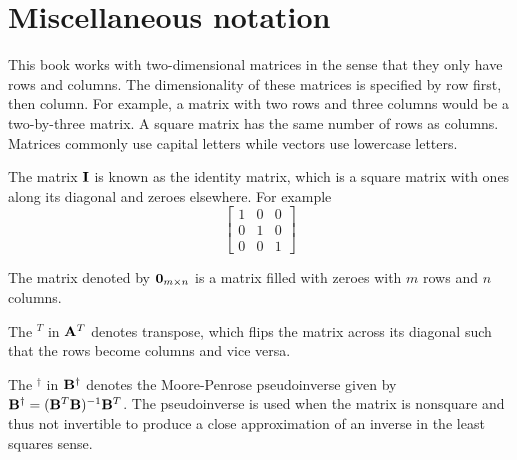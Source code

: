 \section{Miscellaneous notation}

This book works with two-dimensional matrices in the sense that they only have
rows and columns. The dimensionality of these matrices is specified by row
first, then column. For example, a matrix with two rows and three columns would
be a two-by-three matrix. A square matrix has the same number of rows as
columns. Matrices commonly use capital letters while vectors use lowercase
letters.

The matrix $\mathbf{I}$ is known as the identity matrix, which is a square matrix
with ones along its diagonal and zeroes elsewhere. For example
\begin{equation*}
  \begin{bmatrix}
    1 & 0 & 0 \\
    0 & 1 & 0 \\
    0 & 0 & 1
  \end{bmatrix}
\end{equation*}

The matrix denoted by $\mathbf{0}_{m \times n}$ is a matrix filled with zeroes with
$m$ rows and $n$ columns.

The $^T$ in $\mathbf{A}^T$ denotes transpose, which flips the matrix across its
diagonal such that the rows become columns and vice versa.

The $^\dagger$ in $\mathbf{B}^\dagger$ denotes the Moore-Penrose pseudoinverse
given by $\mathbf{B}^\dagger = (\mathbf{B}^T\mathbf{B})^{-1}\mathbf{B}^T$. The pseudoinverse
is used when the matrix is nonsquare and thus not invertible to produce a close
approximation of an inverse in the least squares sense.
